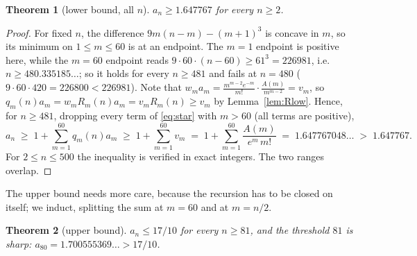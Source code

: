 \documentclass[11pt,a4paper]{amsart}
\theoremstyle{plain}
\newtheorem{theorem}{Theorem}[section]
\theoremstyle{definition}
\begin{document}
\begin{theorem}[lower bound, all $n$]\label{thm:L}
$a_n \ge 1.647767$ for every $n \ge 2$.
\end{theorem}

\begin{proof}
For fixed $n$, the difference $9m(n-m)-(m+1)^3$ is concave in $m$, so its
minimum on $1\le m\le60$ is at an endpoint. The $m=1$ endpoint is positive
here, while the $m=60$ endpoint reads
$9\cdot 60\cdot(n-60)\ge 61^3 = 226981$, i.e.\ $n \ge 480.335185\ldots$; so it
holds for every $n \ge 481$ and fails at $n = 480$
($9\cdot60\cdot420 = 226800 < 226981$). Note that
$w_m a_m = \frac{m^{m-2}e^{-m}}{m!}\cdot\frac{A(m)}{m^{m-2}} = v_m$, so
$q_m(n)a_m = w_m R_m(n) a_m = v_m R_m(n) \ge v_m$ by Lemma~\ref{lem:Rlow}. Hence,
for $n \ge 481$, dropping every term of \eqref{eq:star} with $m>60$ (all terms
are positive),
\[
  a_n \;\ge\; 1+\sum_{m=1}^{60}q_m(n)a_m
      \;\ge\; 1+\sum_{m=1}^{60}v_m
      \;=\; 1+\sum_{m=1}^{60}\frac{A(m)}{e^m\,m!}
      \;=\; 1.647767048\ldots \;>\; 1.647767 .
\]
For $2 \le n \le 500$ the inequality is verified in exact integers. The two
ranges overlap.
\end{proof}

The upper bound needs more care, because the recursion has to be closed on
itself; we induct, splitting the sum at $m=60$ and at $m=n/2$.

\begin{theorem}[upper bound]\label{thm:U}
$a_n \le 17/10$ for every $n \ge 81$, and the threshold $81$ is sharp:
$a_{80} = 1.700555369\ldots > 17/10$.
\end{theorem}
\end{document}
